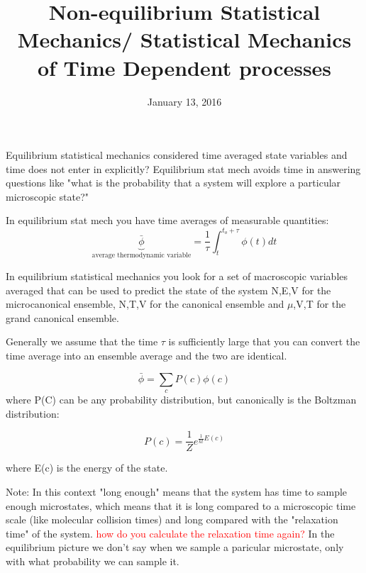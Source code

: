 \documentclass{article}
\begin{document}
\setlength{\parindent}{0pt}

\title{Non-equilibrium Statistical Mechanics/ Statistical Mechanics of Time Dependent processes}
\date{ January 13, 2016}

\maketitle

Equilibrium statistical mechanics considered time averaged state variables and time does not enter in explicitly? Equilibrium stat mech avoids time in answering questions like "what is the probability that a system will explore a particular microscopic state?"

In equilibrium stat mech you have time averages of measurable quantities:
\begin{equation}
\underbrace{\bar{\phi}}_{\text{average thermodynamic variable}}=\frac{1}{\tau}\int_t^{t_o+\tau}\phi(t)dt
\end{equation}

In equilibrium statistical mechanics you look for a set of macroscopic variables averaged that can be used to predict the state of the system {N,E,V} for the microcanonical ensemble, {N,T,V} for the canonical ensemble and {$\mu$,V,T} for the grand canonical ensemble. 

Generally we assume that the time $\tau$ is sufficiently large that you can convert the time average into an ensemble average and the two are identical. 

\begin{equation}
\bar{\phi}=\sum_{c}P(c)\phi(c)
\end{equation}
where P(C) can be any probability distribution, but canonically is the Boltzman distribution:

\begin{equation}
P(c)=\frac{1}{Z}e^{\frac{1}{kt}E(c)}
\end{equation}

where E(c) is the energy of the state.

Note: In this context "long enough" means that the system has time to sample enough microstates, which means that it is long compared to a microscopic time scale (like molecular collision times) and long compared with the "relaxation time" of the system. \textcolor{red}{how do you calculate the relaxation time again?} In the equilibrium picture we don't say when we sample a paricular microstate, only with what probability we can sample it. 
\end{document}
